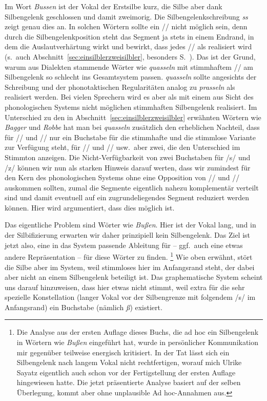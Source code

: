 Im Wort \textit{Bussen} \textipa{[bU\Sgel{s}@n]} ist der Vokal der Erstsilbe kurz, die Silbe aber dank Silbengelenk geschlossen und damit zweimorig.
Die Silbengelenkschreibung \textit{ss} zeigt genau dies an.
In solchen Wörtern sollte ein // nicht möglich sein, denn durch die Silbengelenkposition steht das Segment ja stets in einem Endrand, in dem die Auslautverhärtung wirkt und bewirkt, dass jedes // als \textipa{[s]} realisiert wird (s.\ auch Abschnitt~\ref{sec:einsilblerzweisilbler}, besonders S.~\pageref{abs:silbengelenkstimmlos}).
Das ist der Grund, warum aus Dialekten stammende Wörter wie \textit{quasseln} mit stimmhaftem // am Silbengelenk so schlecht ins Gesamtsystem passen.
\textit{quasseln} sollte angesichts der Schreibung und der phonotaktischen Regularitäten analog zu \textit{prasseln}  als  realisiert werden.
Bei vielen Sprechern wird es aber als  mit einem aus Sicht des phonologischen Systems nicht möglichen stimmhaften Silbengelenk realisiert.
Im Unterschied zu den in Abschnitt~\ref{sec:einsilblerzweisilbler} erwähnten Wörtern wie \textit{Bagger} und \textit{Robbe} hat man bei \textit{quasseln} zusätzlich den erheblichen Nachteil, dass für // und // nur ein Buchstabe für die stimmhafte und die stimmlose Variante zur Verfügung steht, für // und // usw.\ aber zwei, die den Unterschied im Stimmton anzeigen.
Die Nicht-Verfügbarkeit von zwei Buchstaben für /s/ und /z/ können wir nun als starken Hinweis darauf werten, dass wir zumindest für den Kern des phonologischen Systems ohne eine Opposition von // und // auskommen sollten, zumal die Segmente eigentlich nahezu komplementär verteilt sind und damit eventuell auf ein zugrundeliegendes Segment reduziert werden können.
Hier wird argumentiert, dass dies möglich ist.

Das eigentliche Problem sind Wörter wie \textit{Bußen}.
Hier ist der Vokal lang, und in der Silbifizierung \textipa{[bu:.s@n]} erwarten wir daher prinzipiell kein Silbengelenk.
Das Ziel ist jetzt also, eine in das System passende Ableitung für \textipa{[bu:.s@n]} -- ggf.\ auch eine etwas andere Repräsentation -- für diese Wörter zu finden.%
\footnote{Die Analyse aus der ersten Auflage dieses Buchs, die ad hoc ein Silbengelenk in Wörtern wie \textit{Bußen} eingeführt hat, wurde in persönlicher Kommunikation mir gegenüber teilweise energisch kritisiert.
In der Tat lässt sich ein Silbengelenk nach langem Vokal nicht rechtfertigen, worauf mich Ulrike Sayatz eigentlich auch schon vor der Fertigstellung der ersten Auflage hingewiesen hatte.
Die jetzt präsentierte Analyse basiert auf der selben Überlegung, kommt aber ohne unplausible Ad hoc-Annahmen aus.}
Wie oben erwähnt, stört die Silbe \textipa{[s@n]} aber im System, weil stimmloses \textipa{[s]} hier im Anfangsrand steht, der dabei aber nicht an einem Silbengelenk beteiligt ist.
Das graphematische System scheint uns darauf hinzuweisen, dass hier etwas nicht stimmt, weil extra für die sehr spezielle Konstellation (langer Vokal vor der Silbengrenze mit folgendem /s/ im Anfangsrand) ein Buchstabe (nämlich \textit{ß}) existiert.


